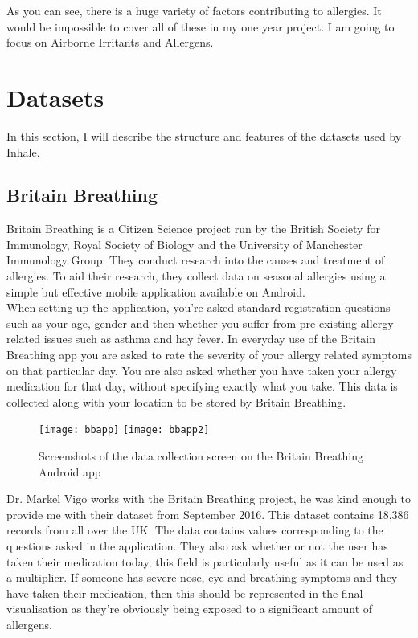 As you can see, there is a huge variety of factors contributing to allergies. It would be impossible to cover all of these in my one year project. I am going to focus on Airborne Irritants and Allergens.


\section{Datasets}

In this section, I will describe the structure and features of the datasets used by Inhale.\\

\subsection{Britain Breathing}

Britain Breathing is a Citizen Science project run by the British Society for Immunology, Royal Society of Biology and the University of Manchester Immunology Group. They conduct research into the causes and treatment of allergies. To aid their research, they collect data on seasonal allergies using a simple but effective mobile application available on Android.\\

When setting up the application, you're asked standard registration questions such as your age, gender and then whether you suffer from pre-existing allergy related issues such as asthma and hay fever. In everyday use of the Britain Breathing app you are asked to rate the severity of your allergy related symptoms on that particular day. You are also asked whether you have taken your allergy medication for that day, without specifying exactly what you take. This data is collected along with your location to be stored by Britain Breathing.

\begin{figure}[H]
\begin{center}
\texttt{[image: bbapp]}
\texttt{[image: bbapp2]}
\caption{Screenshots of the data collection screen on the Britain Breathing Android app}
\label{fig:bbscrn}
\end{center}
\end{figure}

Dr. Markel Vigo works with the Britain Breathing project, he was kind enough to provide me with their dataset from September 2016. This dataset contains 18,386 records from all over the UK. The data contains values corresponding to the questions asked in the application. They also ask whether or not the user has taken their medication today, this field is particularly useful as it can be used as a multiplier. If someone has severe nose, eye and breathing symptoms and they have taken their medication, then this should be represented in the final visualisation as they're obviously being exposed to a significant amount of allergens.\\

